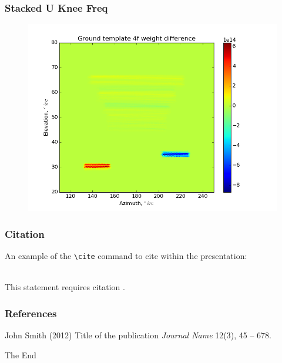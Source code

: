 \documentclass{beamer}
\begin{document}
\begin{frame}
\frametitle{Stacked U Knee Freq}
\begin{figure}
\includegraphics[width=0.9\linewidth]{dw4_gt_STACK_U_FKNEE.png}
\end{figure}
\end{frame}


\begin{frame}[fragile] %
\frametitle{Citation}
An example of the \verb|\cite| command to cite within the presentation:\\~

This statement requires citation \cite{p1}.
\end{frame}


\begin{frame}
\frametitle{References}
\footnotesize{
\begin{thebibliography}{99} %
 John Smith (2012)
\newblock Title of the publication
\newblock \emph{Journal Name} 12(3), 45 -- 678.
\end{thebibliography}
}
\end{frame}


\begin{frame}
\Huge{\centerline{The End}}
\end{frame}

\end{document}
